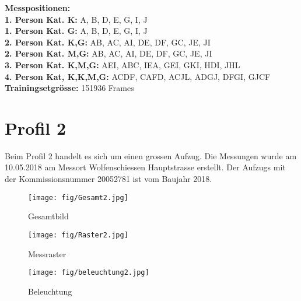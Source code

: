  \textbf{Messpositionen:}\\
\textbf{1. Person Kat. K:} A, B, D, E, G, I, J\\
\textbf{1. Person Kat. G:} A, B, D, E, G, I, J\\
\textbf{2. Person Kat. K,G:} AB, AC, AI, DE, DF, GC, JE, JI  \\
\textbf{2. Person Kat. M,G:} AB, AC, AI, DE, DF, GC, JE, JI  \\
\textbf{3. Person Kat. K,M,G:} AEI, ABC, IEA, GEI, GKI, HDI, JHL \\
\textbf{4. Person Kat, K,K,M,G:} ACDF, CAFD, ACJL, ADGJ, DFGI, GJCF \\
\textbf{Trainingsetgrösse:}         151936 Frames \\
	
	\newpage
	
	
	\section{Profil 2}
Beim Profil 2 handelt es sich um einen grossen Aufzug. Die Messungen wurde am 10.05.2018 am Messort Wolfenschiessen Hauptstrasse erstellt. Der Aufzugs mit der Kommissionsnummer 20052781 ist vom Baujahr 2018.

	
	
		\begin{figure}[!ht]
	\centering
	\begin{minipage}[b]{0.3\linewidth}
		\centering
		\texttt{[image: fig/Gesamt2.jpg]}
		\caption{Gesamtbild}
		\label{fig:profilAnhang4}
	\end{minipage}
	\begin{minipage}[b]{0.3\linewidth}
		\centering
		\texttt{[image: fig/Raster2.jpg]}
		\caption{Messraster}
		\label{fig:profilAnhang5}
	\end{minipage}
	\begin{minipage}[b]{0.3\linewidth}
		\centering
		\texttt{[image: fig/beleuchtung2.jpg]}
		\caption{Beleuchtung}
		\label{fig:profilAnhang6}
	\end{minipage}
\end{figure}

